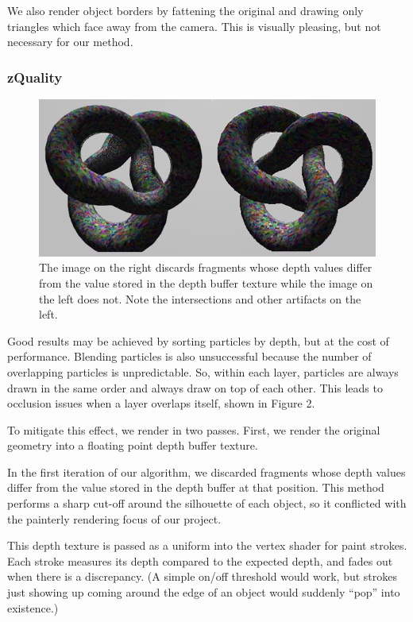 \documentclass[conference]{acmsiggraph}
\begin{document}
We also render object borders by fattening the original and drawing only
triangles which face away from the camera. This is visually pleasing, but not
necessary for our method.


\subsubsection{zQuality}

\begin{figure}[ht] %
  \centering
  \includegraphics[width=6.0in]{images/torus_depth_test_demo}
  \caption{The image on the right discards fragments whose depth values differ
           from the value stored in the depth buffer texture while the image on
           the left does not. Note the intersections and other artifacts on the
           left.}
\end{figure}

Good results may be achieved by sorting particles by depth, but at the cost of
performance. Blending particles is also unsuccessful because the number of
overlapping particles is unpredictable. So, within each layer, particles are
always drawn in the same order and always draw on top of each other. This leads
to occlusion issues when a layer overlaps itself, shown in Figure 2.

To mitigate this effect, we render in two passes. First, we render the original
geometry into a floating point depth buffer texture.

In the first iteration of our algorithm, we discarded fragments whose depth
values differ from the value stored in the depth buffer at that position. This
method performs a sharp cut-off around the silhouette of each object, so it
conflicted with the painterly rendering focus of our project.

This depth texture is passed as a uniform into the vertex shader for paint
strokes. Each stroke measures its depth compared to the expected depth, and
fades out when there is a discrepancy. (A simple on/off threshold would work,
but strokes just showing up coming around the edge of an object would suddenly
``pop'' into existence.)
\end{document}

